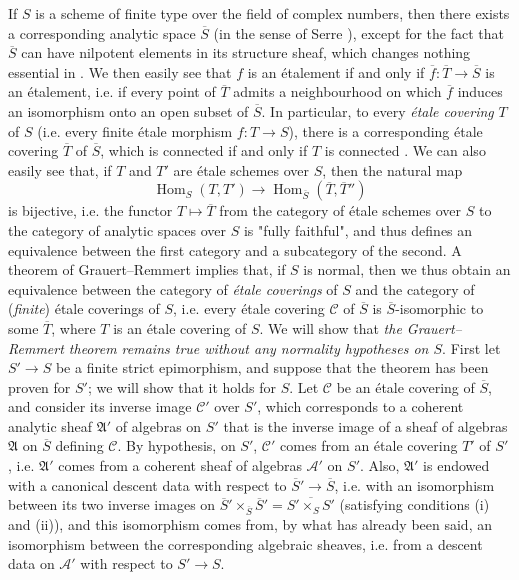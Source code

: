 If $S$ is a scheme of finite type over the field of complex numbers, then there exists a corresponding analytic space $\overline{S}$ (in the sense of Serre \cite{Ser1956}), except for the fact that $\overline{S}$ can have nilpotent elements in its structure sheaf, which changes nothing essential in \cite{Ser1956}.
We then easily see that $f$ is an étalement if and only if $\overline{f}\colon\overline{T}\to\overline{S}$ is an étalement, i.e. if every point of $\overline{T}$ admits a neighbourhood on which $\overline{f}$ induces an isomorphism onto an open subset of $\overline{S}$.
In particular, to every \emph{étale covering} $T$ of $S$ (i.e. every finite étale morphism $f\colon T\to S$), there is a corresponding étale covering $\overline{T}$ of $\overline{S}$, which is connected if and only if $T$ is connected \cite{Ser1956}.
We can also easily see that, if $T$ and $T'$ are étale schemes over $S$, then the natural map
\[\operatorname{Hom}_S(T,T') \to \operatorname{Hom}_{\overline{S}}(\overline{T},\overline{T}'')\]
is bijective, i.e. the functor $T\mapsto\overline{T}$ from the category of étale schemes over $S$ to the category of analytic spaces over $S$ is "fully faithful", and thus defines an equivalence between the first category and a subcategory of the second.
A theorem of Grauert–Remmert \cite{GR1958} implies that, if $S$ is normal, then we thus obtain an equivalence between the category of \emph{étale coverings} of $S$ and the category of (\emph{finite}) étale coverings of $S$, i.e. every étale covering $\mathcal{C}$ of $\overline{S}$ is $\overline{S}$-isomorphic to some $\overline{T}$, where $T$ is an étale covering of $S$.
We will show that \emph{the Grauert–Remmert theorem remains true without any normality hypotheses on $S$}.
First let $S'\to S$ be a finite strict epimorphism, and suppose that the theorem has been proven for $S'$; we will show that it holds for $S$.
Let $\mathcal{C}$ be an étale covering of $\overline{S}$, and consider its inverse image $\mathcal{C}'$ over $S'$, which corresponds to a coherent analytic sheaf $\mathfrak{A}'$ of algebras on $S'$ that is the inverse image of a sheaf of algebras $\mathfrak{A}$ on $\overline{S}$ defining $\mathcal{C}$.
By hypothesis, on $S'$, $\mathcal{C}'$ comes from an étale covering $T'$ of $S'$, i.e. $\mathfrak{A}'$ comes from a coherent sheaf of algebras $\mathcal{A}'$ on $S'$.
Also, $\mathfrak{A}'$ is endowed with a canonical descent data with respect to $\overline{S}'\to\overline{S}$, i.e. with an isomorphism between its two inverse images on $\overline{S}'\times_{\overline{S}}\overline{S}'=\overline{S'\times_SS'}$ (satisfying conditions (i) and (ii)), and this isomorphism comes from, by what has already been said, an isomorphism between the corresponding algebraic sheaves, i.e. from a descent data on $\mathcal{A}'$ with respect to $S'\to S$.
